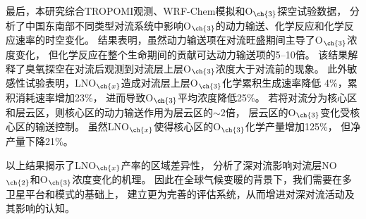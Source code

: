 {最后，本研究综合TROPOMI观测、WRF-Chem模拟和O$_{\ch{3}}$探空试验数据，
分析了中国东南部不同类型对流系统中影响O$_{\ch{3}}$的动力输送、化学反应和化学反应速率的时空变化。
结果表明，虽然动力输送项在对流旺盛期间主导了O$_{\ch{3}}$浓度变化，
但化学反应在整个生命期间的贡献可达动力输送项的5--10倍。
该结果解释了臭氧探空在对流后观测到对流层上层O$_{\ch{3}}$浓度大于对流前的现象。
此外敏感性试验表明，LNO$_{\ch{x}}$造成对流层上层O$_{\ch{3}}$化学累积生成速率降低 4\%，累积消耗速率增加23\%，
进而导致O$_{\ch{3}}$平均浓度降低25\%。
若将对流分为核心区和层云区，则核心区的动力输送作用为层云区的$\sim$2倍，
层云区的O$_{\ch{3}}$变化受核心区的输送控制。
虽然LNO$_{\ch{x}}$使得核心区的O$_{\ch{3}}$化学产量增加125\%，
但净产量下降21\%。

以上结果揭示了LNO$_{\ch{x}}$产率的区域差异性，
分析了深对流影响对流层NO$_{\ch{2}}$和O$_{\ch{3}}$浓度变化的机理。
因此在全球气候变暖的背景下，我们需要在多卫星平台和模式的基础上，
建立更为完善的评估系统，从而增进对深对流活动及其影响的认知。
}
